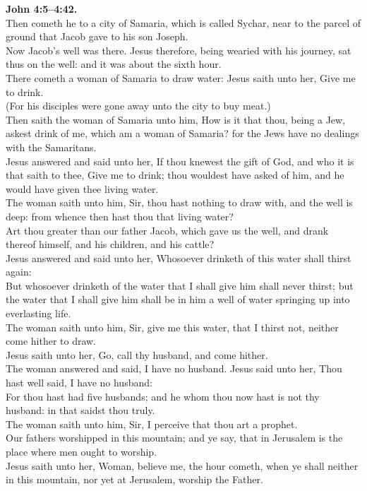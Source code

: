 \documentclass[10pt]{article} %
\begin{document}
{\begin{minipage}[t]{0.46\textwidth}
\textbf{John 4:5--4:42.}\\
Then cometh he to a city of Samaria, which is called Sychar, near to the parcel of ground that Jacob gave to his son Joseph.\\
Now Jacob's well was there. Jesus therefore, being wearied with his journey, sat thus on the well: and it was about the sixth hour.\\
There cometh a woman of Samaria to draw water: Jesus saith unto her, Give me to drink.\\
(For his disciples were gone away unto the city to buy meat.)\\
Then saith the woman of Samaria unto him, How is it that thou, being a Jew, askest drink of me, which am a woman of Samaria? for the Jews have no dealings with the Samaritans.\\
Jesus answered and said unto her, If thou knewest the gift of God, and who it is that saith to thee, Give me to drink; thou wouldest have asked of him, and he would have given thee living water.\\
The woman saith unto him, Sir, thou hast nothing to draw with, and the well is deep: from whence then hast thou that living water?\\
Art thou greater than our father Jacob, which gave us the well, and drank thereof himself, and his children, and his cattle?\\
Jesus answered and said unto her, Whosoever drinketh of this water shall thirst again:\\
But whosoever drinketh of the water that I shall give him shall never thirst; but the water that I shall give him shall be in him a well of water springing up into everlasting life.\\
The woman saith unto him, Sir, give me this water, that I thirst not, neither come hither to draw.\\
Jesus saith unto her, Go, call thy husband, and come hither.\\
The woman answered and said, I have no husband. Jesus said unto her, Thou hast well said, I have no husband:\\
For thou hast had five husbands; and he whom thou now hast is not thy husband: in that saidst thou truly.\\
The woman saith unto him, Sir, I perceive that thou art a prophet.\\
Our fathers worshipped in this mountain; and ye say, that in Jerusalem is the place where men ought to worship.\\
Jesus saith unto her, Woman, believe me, the hour cometh, when ye shall neither in this mountain, nor yet at Jerusalem, worship the Father.\\

\end{minipage}}
\end{document}
